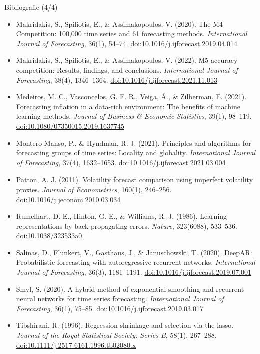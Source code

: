 \begin{frame}{Bibliografie (4/4)}
\itemsize{\scriptsize}
\begin{itemize}
    \item Makridakis, S., Spiliotis, E., \& Assimakopoulos, V. (2020). The M4 Competition: 100,000 time series and 61 forecasting methods. \textit{International Journal of Forecasting}, 36(1), 54--74. \href{https://doi.org/10.1016/j.ijforecast.2019.04.014}{doi:10.1016/j.ijforecast.2019.04.014}
    \item Makridakis, S., Spiliotis, E., \& Assimakopoulos, V. (2022). M5 accuracy competition: Results, findings, and conclusions. \textit{International Journal of Forecasting}, 38(4), 1346--1364. \href{https://doi.org/10.1016/j.ijforecast.2021.11.013}{doi:10.1016/j.ijforecast.2021.11.013}
    \item Medeiros, M. C., Vasconcelos, G. F. R., Veiga, \'A., \& Zilberman, E. (2021). Forecasting inflation in a data-rich environment: The benefits of machine learning methods. \textit{Journal of Business \& Economic Statistics}, 39(1), 98--119. \href{https://doi.org/10.1080/07350015.2019.1637745}{doi:10.1080/07350015.2019.1637745}
    \item Montero-Manso, P., \& Hyndman, R. J. (2021). Principles and algorithms for forecasting groups of time series: Locality and globality. \textit{International Journal of Forecasting}, 37(4), 1632--1653. \href{https://doi.org/10.1016/j.ijforecast.2021.03.004}{doi:10.1016/j.ijforecast.2021.03.004}
    \item Patton, A. J. (2011). Volatility forecast comparison using imperfect volatility proxies. \textit{Journal of Econometrics}, 160(1), 246--256. \href{https://doi.org/10.1016/j.jeconom.2010.03.034}{doi:10.1016/j.jeconom.2010.03.034}
    \item Rumelhart, D. E., Hinton, G. E., \& Williams, R. J. (1986). Learning representations by back-propagating errors. \textit{Nature}, 323(6088), 533--536. \href{https://doi.org/10.1038/323533a0}{doi:10.1038/323533a0}
    \item Salinas, D., Flunkert, V., Gasthaus, J., \& Januschowski, T. (2020). DeepAR: Probabilistic forecasting with autoregressive recurrent networks. \textit{International Journal of Forecasting}, 36(3), 1181--1191. \href{https://doi.org/10.1016/j.ijforecast.2019.07.001}{doi:10.1016/j.ijforecast.2019.07.001}
    \item Smyl, S. (2020). A hybrid method of exponential smoothing and recurrent neural networks for time series forecasting. \textit{International Journal of Forecasting}, 36(1), 75--85. \href{https://doi.org/10.1016/j.ijforecast.2019.03.017}{doi:10.1016/j.ijforecast.2019.03.017}
    \item Tibshirani, R. (1996). Regression shrinkage and selection via the lasso. \textit{Journal of the Royal Statistical Society: Series B}, 58(1), 267--288. \href{https://doi.org/10.1111/j.2517-6161.1996.tb02080.x}{doi:10.1111/j.2517-6161.1996.tb02080.x}
\end{itemize}
\end{frame}


